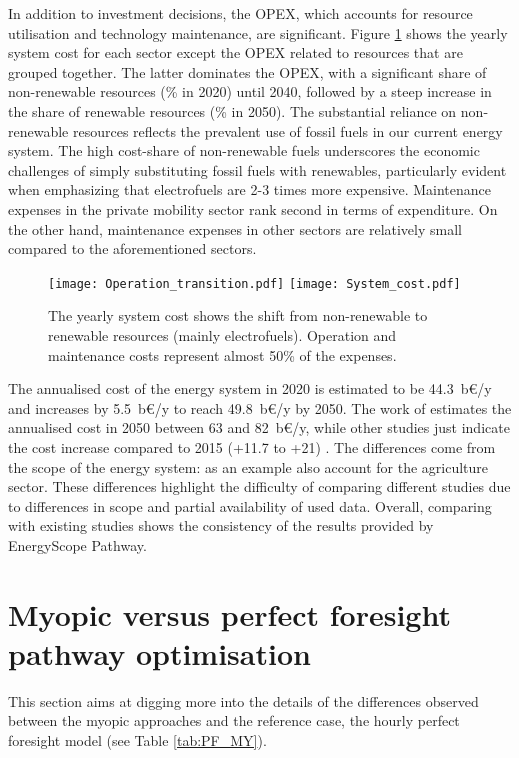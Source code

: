 In addition to investment decisions, the \acrfull{OPEX}, which accounts for resource utilisation and technology maintenance, are significant. Figure \ref{fig:pestd_cumul_op} shows the yearly system cost for each sector except the \gls{OPEX} related to resources that are grouped together. The latter dominates the \gls{OPEX}, with a significant share of non-renewable resources (\% in 2020) until 2040, followed by a steep increase in the share of renewable resources (\% in 2050). The substantial reliance on non-renewable resources reflects the prevalent use of fossil fuels in our current energy system. The high cost-share of non-renewable fuels underscores the economic challenges of simply substituting fossil fuels with renewables, particularly evident when emphasizing that electrofuels are 2-3 times more expensive. Maintenance expenses in the private mobility sector rank second in terms of expenditure. On the other hand, maintenance expenses in other sectors are relatively small compared to the aforementioned sectors.

\begin{figure}[!htbp] %
\centering
\texttt{[image: Operation\_transition.pdf]}
\texttt{[image: System\_cost.pdf]}
\caption{The yearly system cost shows the shift from non-renewable to renewable resources (mainly electrofuels). Operation and maintenance costs represent almost 50\% of the expenses.}
\label{fig:pestd_cumul_op}
\end{figure}

The annualised cost of the energy system in 2020 is estimated to be 44.3~b€/y and increases by 5.5~b€/y to reach 49.8~b€/y by 2050. The work of \citet{My2050} estimates the annualised cost in 2050 between 63 and 82~b€/y, while other studies just indicate the cost increase compared to 2015 (+11.7 to +21) \citep{Devogelaer2013,PATHS2050}. The differences come from the scope of the energy system: as an example \citet{My2050} also account for the agriculture sector. These differences highlight the difficulty of comparing different studies due to differences in scope and partial availability of used data. Overall, comparing with existing studies shows the consistency of the results provided by EnergyScope Pathway.

\newpage
\section{Myopic versus perfect foresight pathway optimisation}
\label{app:my_vs_pf}
This section aims at digging more into the details of the differences observed between the myopic approaches and the reference case, the hourly perfect foresight model (see Table \ref{tab:PF_MY}).

